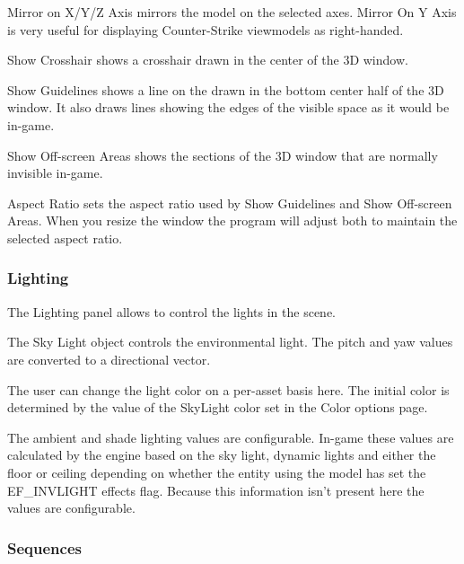\documentclass[10pt, a4paper, titlepage, oneside]{article}
\begin{document}
\vspace{\baselineskip}
Mirror on X/Y/Z Axis mirrors the model on the selected axes. Mirror On Y Axis is very useful for displaying Counter-Strike viewmodels as right-handed.

\vspace{\baselineskip}
Show Crosshair shows a crosshair drawn in the center of the 3D window.

\vspace{\baselineskip}
Show Guidelines shows a line on the drawn in the bottom center half of the 3D window. It also draws lines showing the edges of the visible space as it would be in-game.

\vspace{\baselineskip}
Show Off-screen Areas shows the sections of the 3D window that are normally invisible in-game.

\vspace{\baselineskip}
Aspect Ratio sets the aspect ratio used by Show Guidelines and Show Off-screen Areas. When you resize the window the program will adjust both to maintain the selected aspect ratio.

\subsubsection{Lighting}

The Lighting panel allows to control the lights in the scene.

\vspace{\baselineskip}
The Sky Light object controls the environmental light. The pitch and yaw values are converted to a directional vector.

\vspace{\baselineskip}
The user can change the light color on a per-asset basis here. The initial color is determined by the value of the SkyLight color set in the Color options page.

\vspace{\baselineskip}
The ambient and shade lighting values are configurable. In-game these values are calculated by the engine based on the sky light, dynamic lights and either the floor or ceiling depending on whether the entity using the model has set the EF\_INVLIGHT effects flag. Because this information isn't present here the values are configurable.

\newpage

\subsubsection{Sequences}
\end{document}
